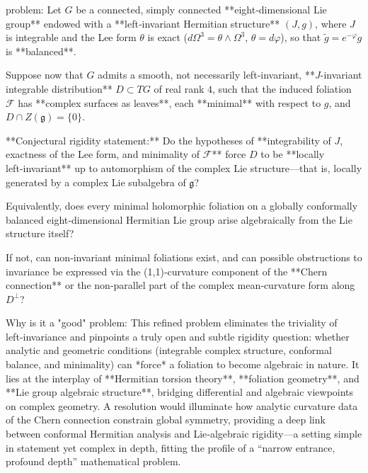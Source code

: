 problem:  
Let \(G\) be a connected, simply connected **eight‑dimensional Lie group** endowed with a **left‑invariant Hermitian structure** \((J,g)\), where \(J\) is integrable and the Lee form \(\theta\) is exact (\(d\Omega^3=\theta\wedge\Omega^3\), \(\theta=d\varphi\)), so that \(\tilde g=e^{-\varphi}g\) is **balanced**.  

Suppose now that \(G\) admits a smooth, not necessarily left‑invariant, **\(J\)-invariant integrable distribution** \(D\subset TG\) of real rank \(4\), such that the induced foliation \(\mathcal{F}\) has **complex surfaces as leaves**, each **minimal** with respect to \(g\), and \(D\cap Z(\mathfrak g)=\{0\}\).  

**Conjectural rigidity statement:**  
Do the hypotheses of **integrability of \(J\), exactness of the Lee form, and minimality of \(\mathcal{F}\)** force \(D\) to be **locally left‑invariant** up to automorphism of the complex Lie structure—that is, locally generated by a complex Lie subalgebra of \(\mathfrak g\)?  

Equivalently, does every minimal holomorphic foliation on a globally conformally balanced eight‑dimensional Hermitian Lie group arise algebraically from the Lie structure itself?  

If not, can non‑invariant minimal foliations exist, and can possible obstructions to invariance be expressed via the (1,1)‑curvature component of the **Chern connection** or the non‑parallel part of the complex mean‑curvature form along \(D^\perp\)?  

Why is it a "good" problem:  
This refined problem eliminates the triviality of left‑invariance and pinpoints a truly open and subtle rigidity question: whether analytic and geometric conditions (integrable complex structure, conformal balance, and minimality) can *force* a foliation to become algebraic in nature.  
It lies at the interplay of **Hermitian torsion theory**, **foliation geometry**, and **Lie group algebraic structure**, bridging differential and algebraic viewpoints on complex geometry.  
A resolution would illuminate how analytic curvature data of the Chern connection constrain global symmetry, providing a deep link between conformal Hermitian analysis and Lie‑algebraic rigidity—a setting simple in statement yet complex in depth, fitting the profile of a “narrow entrance, profound depth” mathematical problem.